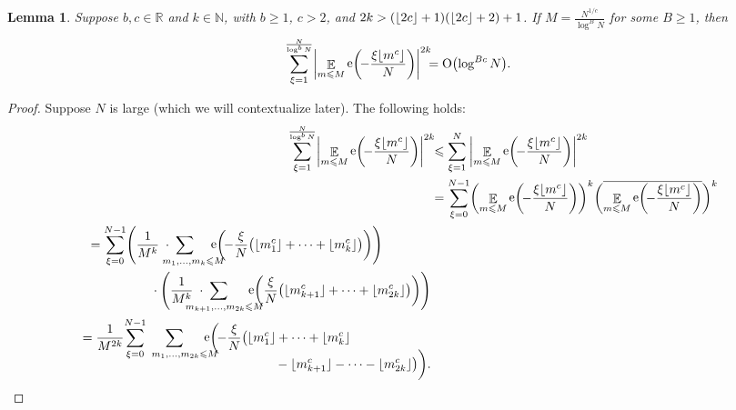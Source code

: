 \documentclass[letterpaper, 12pt]{article}
\theoremstyle{plain}
\newtheorem{Lemma}[Theorem]{Lemma}
\theoremstyle{definition}
\theoremstyle{plain}
\theoremstyle{plain}
\numberwithin{equation}{section}
\newcommand{\Oh}{{\rm O}}
\newcommand{\N}{\mathbb{N}}
\newcommand{\R}{\mathbb{R}}
\renewcommand{\leq}{\leqslant}
\renewcommand{\geq}{\geqslant}
\newcommand{\E}{\mathbb{E}}
\newcommand{\1}{\textbf{1}}
\DeclarePairedDelimiter\floor{\lfloor}{\rfloor}
\DeclareMathOperator{\e}{e}
\begin{document}
\begin{Lemma}\label{lem:poulias-bound}
    Suppose $b, c \in \R$ and \(k \in \N\), with \(b \geq 1\), \(c > 2\), and $2k > (\floor{2c} + 1)(\floor{2c} + 2) + 1$. If $M = \frac{N^{1/c}}{\log^B N}$ for some $B \geq 1$, then
    \[
        \sum_{\xi = 1}^{\frac{N}{\log^b N}} \biggl\lvert \mathop{\E}_{m \leq M} \e\biggl(\!-\frac{\xi \floor{m^c}}{N}  \biggr) \biggr\rvert^{2k}
        \!\!\! = \Oh\bigl(\log^{Bc} N \bigr).
    \]
\end{Lemma}
\begin{proof}
    Suppose $N$ is large (which we will contextualize later). The following holds:
    \begin{align*}
        \sum_{\xi = 1}^{\frac{N}{\log^b N}} \biggl\lvert \mathop{\E}_{m \leq M} \e\biggl(\! -\frac{\xi \floor{m^c}}{N} \biggr) \biggr\rvert^{2k}
        \!\! &\leq \sum_{\xi = 1}^{N}\: \biggl\lvert \mathop{\E}_{m \leq M} \e\biggl(\! -\frac{\xi \floor{m^c}}{N} \biggr) \biggr\rvert^{2k}\\
        &= \sum_{\xi = 0}^{N - 1} \biggl(\mathop{\E}_{m \leq M} \e\biggl(\! -\frac{\xi \floor{m^c}}{N} \biggr)\biggr)^k \biggl(\overline{\mathop{\E}_{m \leq M} \e\biggl(\! -\frac{\xi \floor{m^c}}{N} \biggr)}\biggr)^k\\
        \begin{split}
            &= \sum_{\xi = 0}^{N - 1} \Biggl(\frac{1}{M^k} \;\cdot\; 
            \smashoperator{\sum_{\mkern30mu m_1, \ldots, m_k \leq M}}\quad\, \e\biggl(\! -\frac{\xi}{N} \bigl(\floor{m_1^c} + \cdots + \floor{m_k^c} \bigr)\biggr)\Biggr)\\
            &\hphantom{= \sum_{\xi = 0}^{N - 1}}\qquad\: \cdot 
            \Biggl(\frac{1}{M^k} \;\cdot\; \smashoperator{\sum_{\mkern20mu m_{k + 1}, \ldots, m_{2k} \leq M}}\quad\;\, \e\biggl(\frac{\xi}{N} \bigl(\floor{m_{k+1}^c} + \cdots + \floor{m_{2k}^c} \bigr)\biggr)\Biggr)
        \end{split}\\
        \begin{split}
            &= \frac{1}{M^{2k}} \! \sum_{\xi = 0}^{N - 1} \mkern-25mu \smashoperator[r]{\sum_{\mkern36mu m_1, \ldots, m_{2k} \leq M}}\quad\;\, \e\biggl(\! -\frac{\xi}{N} \bigl(\floor{m_1^c} + \cdots + \floor{m_k^c}\\[-1.2em]
            &\hphantom{= \frac{1}{M^{2k}} \! \sum_{\xi = 0}^{N - 1} \mkern-25mu \smashoperator[r]{\sum_{\mkern36mu m_1, \ldots, m_{2k} \leq M}}\quad\;\, \e\biggl(\! -\frac{\xi}{N} \bigl(\floor{m_1^c}}\:
            - \floor{m_{k + 1}^c} - \cdots - \floor{m_{2k}^c} \bigr)\biggr).
        \end{split}
    \end{align*}
    

\end{proof}
\end{document}
